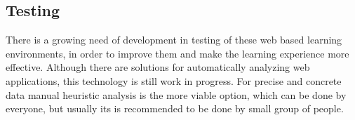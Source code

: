 \documentclass[10pt,english,a4paper]{article}
\begin{document}
\subsection*{Testing}
There is a growing need of development in testing of these web based learning environments, in order
to improve them and make the learning experience more effective.
Although there are solutions for automatically analyzing web applications, this technology is still work
in progress. For precise and concrete data manual heuristic analysis is the more viable option,
which can be done by everyone, but usually its is recommended to be done by small group of people.




\end{document}
